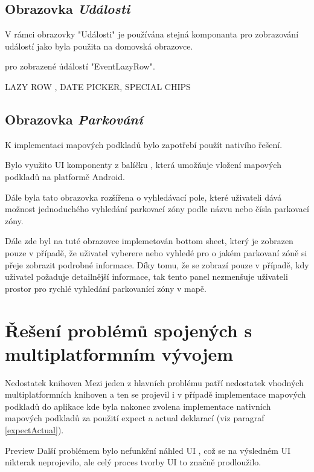 \subsection{Obrazovka \textit{Události}}

V rámci obrazovky "Události" je používána stejná komponanta pro zobrazování událostí jako byla použita na domovská obrazovce. 

pro zobrazené údálostí "EventLazyRow". 

LAZY ROW , DATE PICKER, SPECIAL CHIPS


\subsection{Obrazovka \textit{Parkování}} \label{parkingScreenImpl}
K implementaci mapových podkladů bylo zapotřebí použít nativího řešení. 


Bylo využito UI komponenty  z balíčku , která umožňuje vložení mapových podkladů 
na platformě Android.

Dále byla tato obrazovka rozšířena o vyhledávací pole, které uživateli dává možnost jednoduchého vyhledání parkovací zóny podle názvu nebo čísla 
parkovací zóny.



Dále zde byl na tuté obrazovce implemetován bottom sheet, který je zobrazen pouze v případě, že uživatel vyberere nebo vyhledé pro o jakém 
parkovaní zóně si přeje zobrazit podrobné informace. Díky tomu, že se zobrazí pouze v případě, kdy uživatel požaduje detailnější informace, tak
tento panel nezmenšuje uživateli prostor pro rychlé vyhledání parkovanící zóny v mapě.



\section{Řešení problémů spojených s multiplatformním vývojem}
Nedostatek knihoven
Mezi jeden z hlavních problému patří nedostatek vhodných multiplatformních knihoven a ten se projevil i v případě implementace mapových podkladů
do aplikace kde byla nakonec zvolena implementace nativních mapových podkladů za použití expect a actual deklarací (viz paragraf \ref{expectActual}).

Preview
Další problémem bylo nefunkční náhled UI , což se na výsledném UI nikterak neprojevilo, ale celý proces tvorby UI to značně prodloužilo.

